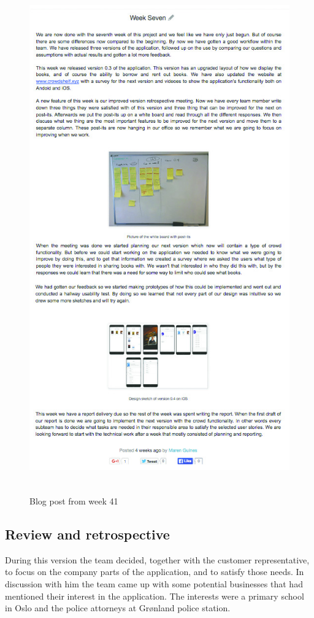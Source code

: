 \begin{figure}
\centering
\includegraphics[height=22cm]{figs/v03/WeekSeven.jpg}
\caption{Blog post from week 41}
\label{fig:week-seven}
\end{figure}

\subsection{Review and retrospective}
During this version the team decided, together with the customer representative, to focus on the company parts of the application, and to satisfy those needs. In discussion with him the team came up with some potential businesses that had mentioned their interest in the application. The interests were a primary school in Oslo and the police attorneys at Grønland police station.


